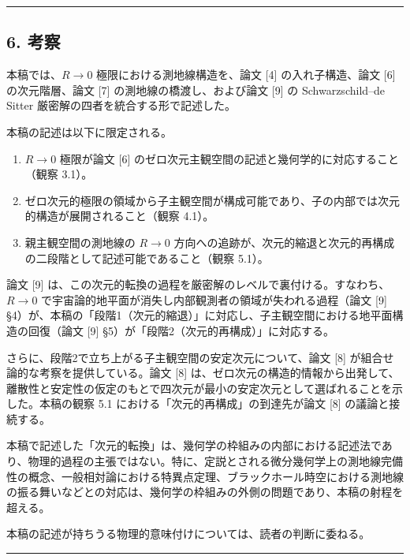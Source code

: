 \documentclass[a4paper,11pt]{ltjsarticle}
\theoremstyle{definition}
\providecommand{\tightlist}{\setlength{\itemsep}{0pt}\setlength{\parskip}{0pt}}
\begin{document}
\begin{center}\rule{0.5\linewidth}{0.5pt}\end{center}

\subsection{6. 考察}\label{ux8003ux5bdf}

本稿では、\(R \to 0\) 極限における測地線構造を、論文 {[}4{]}
の入れ子構造、論文 {[}6{]} の次元階層、論文 {[}7{]}
の測地線の橋渡し、および論文 {[}9{]} の Schwarzschild--de Sitter
厳密解の四者を統合する形で記述した。

本稿の記述は以下に限定される。

\begin{enumerate}
\def\labelenumi{\arabic{enumi}.}
\tightlist
\item
  \(R \to 0\) 極限が論文 {[}6{]}
  のゼロ次元主観空間の記述と幾何学的に対応すること（観察 3.1）。
\item
  ゼロ次元的極限の領域から子主観空間が構成可能であり、子の内部では次元的構造が展開されること（観察
  4.1）。
\item
  親主観空間の測地線の \(R \to 0\)
  方向への追跡が、次元的縮退と次元的再構成の二段階として記述可能であること（観察
  5.1）。
\end{enumerate}

論文 {[}9{]}
は、この次元的転換の過程を厳密解のレベルで裏付ける。すなわち、\(R \to 0\)
で宇宙論的地平面が消失し内部観測者の領域が失われる過程（論文 {[}9{]}
§4）が、本稿の「段階1（次元的縮退）」に対応し、子主観空間における地平面構造の回復（論文
{[}9{]} §5）が「段階2（次元的再構成）」に対応する。

さらに、段階2で立ち上がる子主観空間の安定次元について、論文 {[}8{]}
が組合せ論的な考察を提供している。論文 {[}8{]}
は、ゼロ次元の構造的情報から出発して、離散性と安定性の仮定のもとで四次元が最小の安定次元として選ばれることを示した。本稿の観察
5.1 における「次元的再構成」の到達先が論文 {[}8{]} の議論と接続する。

本稿で記述した「次元的転換」は、幾何学の枠組みの内部における記述法であり、物理的過程の主張ではない。特に、定説とされる微分幾何学上の測地線完備性の概念、一般相対論における特異点定理、ブラックホール時空における測地線の振る舞いなどとの対応は、幾何学の枠組みの外側の問題であり、本稿の射程を超える。

本稿の記述が持ちうる物理的意味付けについては、読者の判断に委ねる。

\begin{center}\rule{0.5\linewidth}{0.5pt}\end{center}
\end{document}
